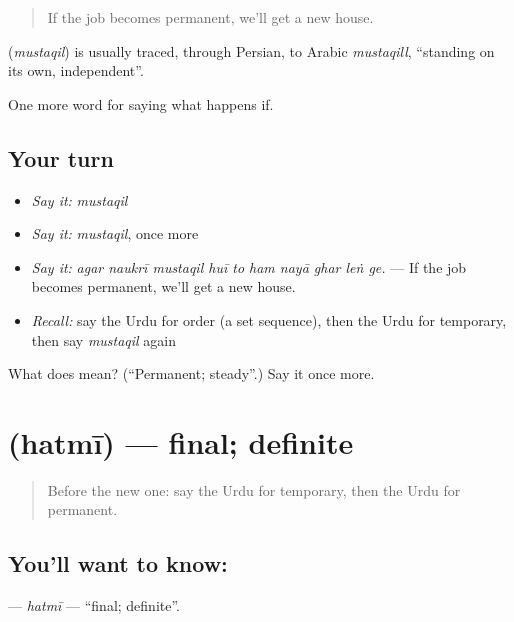 \begin{quote}
If the job becomes permanent, we'll get a new house.
\end{quote}

\begin{cousinweb}
\textbf{} (\emph{mustaqil}) is usually traced, through Persian, to Arabic \emph{mustaqill}, \textquotedblleft{}standing on its own, independent\textquotedblright{}.
\end{cousinweb}

\begin{grammarlens}[title={What you've built}]
One more word for saying what happens if.
\end{grammarlens}

\subsection*{Your turn}
\begin{itemize}
\raggedright
  \item \emph{Say it:} \emph{mustaqil}
  \item \emph{Say it:} \emph{mustaqil}, once more
  \item \emph{Say it:} \emph{agar naukrī mustaqil huī to ham nayā ghar leṅ ge.} — If the job becomes permanent, we'll get a new house.
  \item \emph{Recall:} say the Urdu for order (a set sequence), then the Urdu for temporary, then say \emph{mustaqil} again
\end{itemize}

\begin{tcolorbox}[breakable,colback=teal!4,colframe=teal!35!black,title={Before you move on}]
What does  mean? (\textquotedblleft{}Permanent; steady\textquotedblright{}.) Say it once more.
\end{tcolorbox}
\section[\texorpdfstring{\ur{حتمی} (hatmī)}{حتمی (hatmī)}]{ (hatmī) — final; definite}

\label{lesson:UR-C545-hatmi}



\begin{quote}
Before the new one: say the Urdu for temporary, then the Urdu for permanent.
\end{quote}

\subsection*{You'll want to know: }
\textbf{} — \emph{hatmī} — \textquotedblleft{}final; definite\textquotedblright{}.

